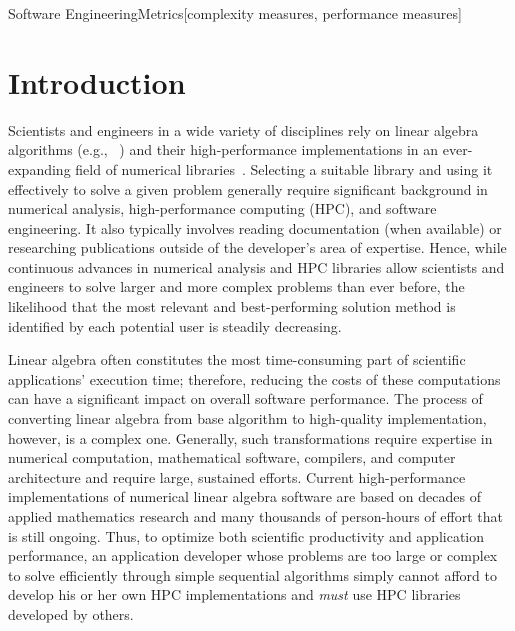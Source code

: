 \documentclass{sig-alternate}
\begin{document}
 {Soft\-ware Engineering}{Metrics}[complexity measures, performance measures]




\section{Introduction}
\label{sec:intro}


Scientists and engineers in a wide variety of disciplines rely on linear algebra algorithms 
(e.g., ~\cite{vidal,Katz,bryan200625}) and their high-performance implementations in 
an ever-expanding field of numerical libraries~\cite{JackMark:Online}.
Selecting a suitable library and using it effectively to solve a given problem generally require 
significant background in numerical analysis, high-performance computing (HPC), and software engineering. It also 
typically involves reading documentation (when available) or researching publications outside of the 
developer's area of expertise. Hence, while continuous advances in numerical analysis and HPC libraries 
allow scientists and engineers to solve larger and more complex problems than ever before, the 
likelihood that the most relevant and best-performing solution method is identified by each 
potential user is steadily decreasing. 

Linear algebra often constitutes the most time-consuming part of scientific applications' execution time; therefore, reducing the
costs of these computations can have a significant impact on overall software performance. 
The process of converting linear algebra from base algorithm to
high-quality implementation, however, is a complex one. Generally, such transformations require expertise in numerical computation,
mathematical software, compilers, and computer architecture and require large, sustained efforts. 
Current high-performance implementations of numerical linear algebra software are based on decades of applied mathematics research
and many thousands of person-hours of effort that is still ongoing. 
Thus, to optimize both scientific productivity and application performance, an application developer whose problems are too large or
complex to solve efficiently through simple sequential algorithms simply cannot afford to develop his or her own 
HPC implementations and \emph{must} use HPC libraries developed by others. 
\end{document}

